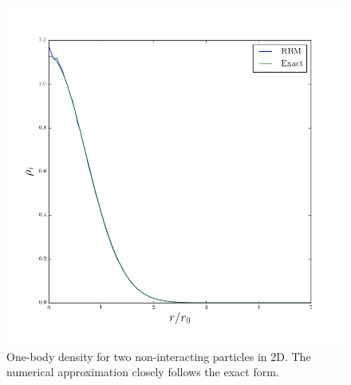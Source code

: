 \documentclass[a4paper, 11pt]{article}
\begin{document}
\begin{figure}[ht]
    \centering
    \includegraphics[width=0.8\linewidth]{../results/P2-D2-onebody.png}
    \caption{One-body density for two non-interacting particles in 2D. The
    numerical approximation closely follows the exact form.}
    \label{fig:rbm-onebody-ideal}
\end{figure}
\end{document}
